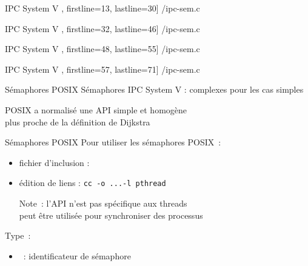 \begin {frame} {IPC System V}
    \scriptsize\lstmonstyle, firstline=13, lastline=30] {\inc/ipc-sem.c}
\end {frame}

\begin {frame} {IPC System V}
    \scriptsize\lstmonstyle, firstline=32, lastline=46] {\inc/ipc-sem.c}
\end {frame}

\begin {frame} {IPC System V}
    \scriptsize\lstmonstyle, firstline=48, lastline=55] {\inc/ipc-sem.c}
\end {frame}

\begin {frame} {IPC System V}
    \scriptsize\lstmonstyle, firstline=57, lastline=71] {\inc/ipc-sem.c}
\end {frame}




\begin {frame} {Sémaphores POSIX}
    Sémaphores IPC System V : complexes pour les cas simples

    \vspace* {3mm}

    POSIX a normalisé une API simple et homogène \\
    plus proche de la définition de Dijkstra
\end {frame}

\begin {frame} {Sémaphores POSIX}
    Pour utiliser les sémaphores POSIX~:
    \begin {itemize}
	\item fichier d'inclusion : 
	\item édition de liens : \texttt {cc -o ...-l pthread}

	    Note~: l'API n'est pas spécifique aux threads \\
	    \implique peut être utilisée pour synchroniser des processus
    \end {itemize}

    Type~:

    \begin {itemize}
	\item {}~: identificateur de sémaphore
    \end {itemize}

\end {frame}


